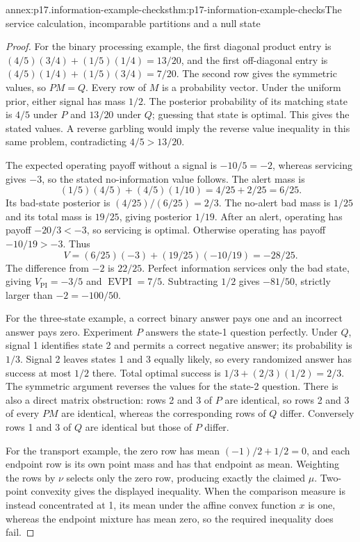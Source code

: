 \begin{annexitem}{annex:p17.information-example-checks}{thm:p17-information-example-checks}{The service calculation, incomparable partitions and a null state}
\begin{proof}
For the binary processing example, the first diagonal product entry is
\((4/5)(3/4)+(1/5)(1/4)=13/20\), and the first off-diagonal entry
is \((4/5)(1/4)+(1/5)(3/4)=7/20\). The second row gives the symmetric
values, so \(PM=Q\). Every row of \(M\) is a probability vector.
Under the uniform prior, either signal has mass \(1/2\). The posterior
probability of its matching state is \(4/5\) under \(P\) and \(13/20\)
under \(Q\); guessing that state is optimal. This gives the stated values.
A reverse garbling would imply the reverse value inequality in this same
problem, contradicting \(4/5>13/20\).

The expected operating payoff without a signal is \(-10/5=-2\),
whereas servicing gives \(-3\), so the stated no-information value follows.
The alert mass is
\[
            (1/5)(4/5)+(4/5)(1/10)=4/25+2/25=6/25.
\]
Its bad-state posterior is \((4/25)/(6/25)=2/3\).
The no-alert bad mass is \(1/25\) and its total mass is \(19/25\),
giving posterior \(1/19\).
After an alert, operating has payoff \(-20/3<-3\), so servicing is
optimal. Otherwise operating has payoff \(-10/19>-3\).
Thus
\[
                V=(6/25)(-3)+(19/25)(-10/19)=-28/25.
\]
The difference from \(-2\) is \(22/25\).
Perfect information services only the bad state, giving
\(V_{\mathrm{PI}}=-3/5\) and \(\operatorname{EVPI}=7/5\).
Subtracting \(1/2\) gives \(-81/50\), strictly larger than
\(-2=-100/50\).

For the three-state example, a correct binary answer pays one and an
incorrect answer pays zero. Experiment \(P\) answers the state-1 question
perfectly. Under \(Q\), signal 1 identifies state 2 and permits a correct
negative answer; its probability is \(1/3\). Signal 2 leaves states
1 and 3 equally likely, so every randomized answer has success at most
\(1/2\) there. Total optimal success is
\(1/3+(2/3)(1/2)=2/3\).
The symmetric argument reverses the values for the state-2 question.
There is also a direct matrix obstruction: rows 2 and 3 of \(P\)
are identical, so rows 2 and 3 of every \(PM\) are identical, whereas
the corresponding rows of \(Q\) differ. Conversely rows 1 and 3 of
\(Q\) are identical but those of \(P\) differ.

For the transport example, the zero row has mean
\((-1)/2+1/2=0\), and each endpoint row is its own point mass and has
that endpoint as mean. Weighting the rows by \(\nu\) selects only
the zero row, producing exactly the claimed \(\mu\). Two-point convexity
gives the displayed inequality. When the comparison measure is instead
concentrated at 1, its mean under the affine convex function \(x\) is one,
whereas the endpoint mixture has mean zero, so the required inequality
does fail.


\end{proof}
\end{annexitem}
